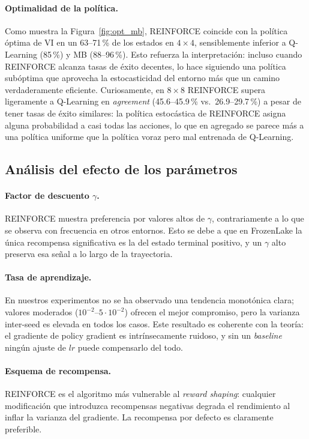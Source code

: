 \documentclass[11pt,a4paper]{article}
\begin{document}
\paragraph{Optimalidad de la política.} Como muestra la Figura~\ref{fig:opt_mb}, REINFORCE coincide con la política óptima de VI en un 63--71\,\% de los estados en $4\times 4$, sensiblemente inferior a Q-Learning (85\,\%) y MB (88--96\,\%). Esto refuerza la interpretación: incluso cuando REINFORCE alcanza tasas de éxito decentes, lo hace siguiendo una política subóptima que aprovecha la estocasticidad del entorno más que un camino verdaderamente eficiente. Curiosamente, en $8\times 8$ REINFORCE supera ligeramente a Q-Learning en \emph{agreement} (45.6--45.9\,\% vs.\ 26.9--29.7\,\%) a pesar de tener tasas de éxito similares: la política estocástica de REINFORCE asigna alguna probabilidad a casi todas las acciones, lo que en agregado se parece más a una política uniforme que la política voraz pero mal entrenada de Q-Learning.

\subsection{Análisis del efecto de los parámetros}

\paragraph{Factor de descuento $\gamma$.} REINFORCE muestra preferencia por valores altos de $\gamma$, contrariamente a lo que se observa con frecuencia en otros entornos. Esto se debe a que en FrozenLake la única recompensa significativa es la del estado terminal positivo, y un $\gamma$ alto preserva esa señal a lo largo de la trayectoria.

\paragraph{Tasa de aprendizaje.} En nuestros experimentos no se ha observado una tendencia monotónica clara; valores moderados ($10^{-2}$--$5\!\cdot\!10^{-2}$) ofrecen el mejor compromiso, pero la varianza inter-seed es elevada en todos los casos. Este resultado es coherente con la teoría: el gradiente de policy gradient es intrínsecamente ruidoso, y sin un \emph{baseline} ningún ajuste de $lr$ puede compensarlo del todo.

\paragraph{Esquema de recompensa.} REINFORCE es el algoritmo más vulnerable al \emph{reward shaping}: cualquier modificación que introduzca recompensas negativas degrada el rendimiento al inflar la varianza del gradiente. La recompensa por defecto es claramente preferible.
\end{document}

